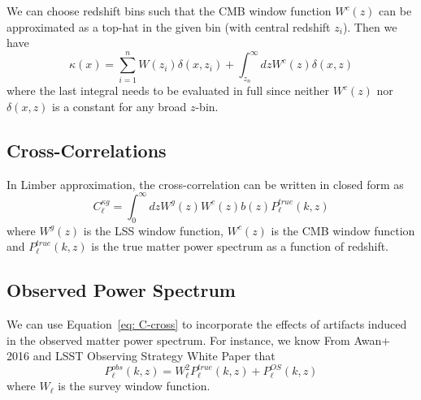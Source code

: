 \documentclass{article}
\newcommand{\eq}[1]{\begin{equation}{#1}\end{equation}}
\begin{document}
{We can choose redshift bins such that the CMB window function $W^c(z)$ can be approximated as a top-hat in the given bin (with central redshift $z_i$). Then we have
\eq{\kappa(x)= \sum_{i=1}^n W(z_i)\delta(x,z_i) +  \int_{z_n}^\infty dz W^c(z)\delta(x,z) \label{eq: kappa break}}
where the last integral needs to be evaluated in full since neither $W^c(z)$ nor $\delta(x,z) $ is a constant for any broad $z$-bin.

\subsection*{Cross-Correlations}
In Limber approximation, the cross-correlation can be written in closed form as
\eq{C_\ell^{\kappa g}= \int_0^\infty dz W^g(z)W^c(z)b(z)P^{true}_\ell(k, z) \label{eq: C-cross}}
where $W^g(z)$ is the LSS window function, $W^c(z)$ is the CMB window function and $P^{true}_\ell(k, z)$ is the true matter power spectrum as a function of redshift.

\subsection*{Observed Power Spectrum}
We can use Equation~\ref{eq: C-cross} to incorporate the effects of artifacts induced in the observed matter power spectrum. For instance, we know From Awan+ 2016 and LSST Observing Strategy White Paper that
\eq{P^{obs}_\ell(k, z)= W_\ell^2 P^{true}_\ell(k, z) + P^{OS}_\ell(k, z) \label{eq: Pobs}}
where $W_\ell$ is the survey window function.

}
\end{document}
